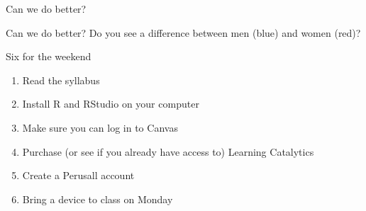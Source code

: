 \documentclass{beamer}\usepackage[]{graphicx}\usepackage[]{color}
\newenvironment{knitrout}{}{} %
\begin{document}
\begin{darkframes}
\begin{frame}{Can we do better?}
\begin{knitrout}


\end{knitrout}
    \end{frame}

    \begin{frame}{Can we do better?}
      Do you see a difference between men (blue) and women (red)?

\begin{knitrout}


\end{knitrout}
    \end{frame}

    \begin{frame}{Six for the weekend}
      \begin{enumerate}
        \item Read the syllabus
        \item Install R and RStudio on your computer
        \item Make sure you can log in to Canvas
        \item Purchase (or see if you already have access to) Learning Catalytics
        \item Create a Perusall account
        \item Bring a device to class on Monday
      \end{enumerate}
    \end{frame}


  \end{darkframes}
\end{document}
